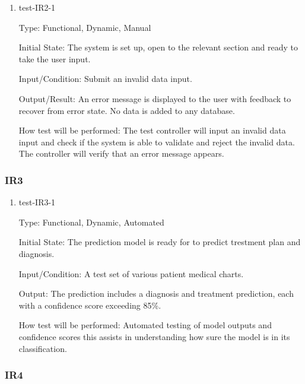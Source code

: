 \documentclass[12pt, titlepage]{article}
\begin{document}
  \begin{enumerate}

    \item{test-IR2-1} \label{test-IR2-1} 
    
    Type: Functional, Dynamic, Manual
    
    Initial State: The system is set up, open to the relevant section and ready to take the user input.
    
    Input/Condition: Submit an invalid data input.
    
    Output/Result: An error message is displayed to the user with feedback to recover from error state. No data is added to any database. 
    
    How test will be performed: The test controller will input an invalid data input and check if the system is able to validate and reject the invalid data. The controller will verify that an error message appears.

  \end{enumerate}

\subsubsection{IR3}
    
  \begin{enumerate}


    \item{test-IR3-1}  \label{test-IR3-1}
    
    Type: Functional, Dynamic, Automated
    
    Initial State: The prediction model is ready for to predict trestment plan and diagnosis.
    
    Input/Condition: A test set of various patient medical charts.

    Output: The prediction includes a diagnosis and treatment prediction, each with a confidence score exceeding 85\%.
    
    How test will be performed: Automated testing of model outputs and confidence scores this assists in understanding how sure the model is in its classification.

  \end{enumerate}

  \subsubsection{IR4}
    
\end{document}
